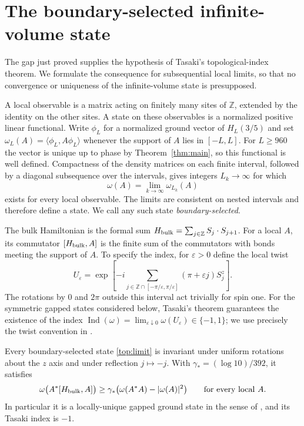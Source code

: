 \section{The boundary-selected infinite-volume state}\label{sec:topology}

The gap just proved supplies the hypothesis of Tasaki's topological-index
theorem. We formulate the consequence for subsequential local limits,
so that no convergence or uniqueness of the infinite-volume state is
presupposed.

A local observable is a matrix acting on finitely many sites of
$\mathbb Z$, extended by the identity on the other sites. A state on
these observables is a normalized positive linear functional. Write
$\phi_L$ for a normalized ground vector of $H_L(3/5)$ and set
$\omega_L(A)=\langle\phi_L,A\phi_L\rangle$ whenever the support of
$A$ lies in $[-L,L]$. For $L\ge960$ the vector is unique up to phase
by Theorem~\ref{thm:main}, so this functional is well defined.
Compactness of the density matrices on each finite interval, followed
by a diagonal subsequence over the intervals, gives integers
$L_k\to\infty$ for which
\begin{equation}\label{top:limit}
 \omega(A)=\lim_{k\to\infty}\omega_{L_k}(A)
\end{equation}
exists for every local observable. The limits are consistent on nested
intervals and therefore define a state. We call any such state
\emph{boundary-selected}.

The bulk Hamiltonian is the formal sum
$H_{\rm bulk}=\sum_{j\in\mathbb Z}S_j\cdot S_{j+1}$.
For a local $A$, its commutator $[H_{\rm bulk},A]$ is the finite sum
of the commutators with bonds meeting the support of $A$.
To specify the index, for $\varepsilon>0$ define the local twist
\begin{equation}\label{top:twist}
 U_\varepsilon=
 \exp\left[-i\sum_{j\in\mathbb Z\cap[-\pi/\varepsilon,\pi/\varepsilon]}
                 (\pi+\varepsilon j)S_j^z\right].
\end{equation}
The rotations by $0$ and $2\pi$ outside this interval act trivially
for spin one. For the symmetric gapped states considered below,
Tasaki's theorem guarantees the existence of the index
$\operatorname{Ind}(\omega)=\lim_{\varepsilon\downarrow0}
\omega(U_\varepsilon)\in\{-1,1\}$; we use precisely the twist convention in
\cite[Equations (10)--(13)]{Tasaki2025}.

\begin{corollary}\label{cor:topology}
Every boundary-selected state \eqref{top:limit} is invariant under
uniform rotations about the $z$ axis and under reflection $j\mapsto-j$.
With $\gamma_*=(\log10)/392$, it satisfies
\begin{equation}\label{top:local-gap}
 \omega\bigl(A^*[H_{\rm bulk},A]\bigr)
 \ge\gamma_*\bigl(\omega(A^*A)-|\omega(A)|^2\bigr)
 \qquad\text{for every local }A.
\end{equation}
In particular it is a locally-unique gapped ground state in the sense
of \cite[Definition 11]{Tasaki2025}, and its Tasaki index is $-1$.
\end{corollary}


